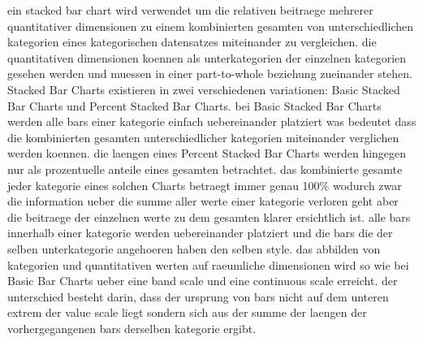 ein stacked bar chart wird verwendet um die relativen beitraege mehrerer quantitativer dimensionen zu einem kombinierten gesamten von unterschiedlichen kategorien eines kategorischen datensatzes miteinander zu vergleichen.
die quantitativen dimensionen koennen als unterkategorien der einzelnen kategorien gesehen werden und muessen in einer part-to-whole beziehung zueinander stehen.
Stacked Bar Charts existieren in zwei verschiedenen variationen: Basic Stacked Bar Charts und Percent Stacked Bar Charts.
bei Basic Stacked Bar Charts werden alle bars einer kategorie einfach uebereinander platziert was bedeutet dass die kombinierten gesamten unterschiedlicher kategorien miteinander verglichen werden koennen.
die laengen eines Percent Stacked Bar Charts werden hingegen nur als prozentuelle anteile eines gesamten betrachtet.
das kombinierte gesamte jeder kategorie eines solchen Charts betraegt immer genau 100\% wodurch zwar die information ueber die summe aller werte einer kategorie verloren geht aber die beitraege der einzelnen werte zu dem gesamten klarer ersichtlich ist.
alle bars innerhalb einer kategorie werden uebereinander platziert und die bars die der selben unterkategorie angehoeren haben den selben style.
das abbilden von kategorien und quantitativen werten auf raeumliche dimensionen wird so wie bei Basic Bar Charts ueber eine band scale und eine continuous scale erreicht.
der unterschied besteht darin, dass der ursprung von bars nicht auf dem unteren extrem der value scale liegt sondern sich aus der summe der laengen der vorhergegangenen bars derselben kategorie ergibt.

